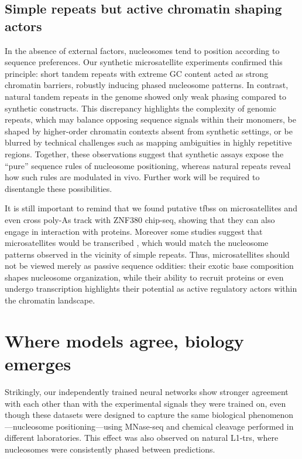 \documentclass[11pt]{book}
\begin{document}
\subsection{Simple repeats but active chromatin shaping actors}
In the absence of external factors, nucleosomes tend to position according to sequence preferences. Our synthetic microsatellite experiments confirmed this principle: short tandem repeats with extreme GC content acted as strong chromatin barriers, robustly inducing phased nucleosome patterns. In contrast, natural tandem repeats in the genome showed only weak phasing compared to synthetic constructs. This discrepancy highlights the complexity of genomic repeats, which may balance opposing sequence signals within their monomers, be shaped by higher-order chromatin contexts absent from synthetic settings, or be blurred by technical challenges such as mapping ambiguities in highly repetitive regions. Together, these observations suggest that synthetic assays expose the “pure” sequence rules of nucleosome positioning, whereas natural repeats reveal how such rules are modulated in vivo. Further work will be required to disentangle these possibilities.

It is still important to remind that we found putative \glspl{tfbs} on microsatellites and even cross poly-As track with ZNF380 chip-seq, showing that they can also engage in interaction with proteins. Moreover some studies suggest that microsatellites would be transcribed \cite{grapotte_discovery_2021}, which would match the nucleosome patterns observed in the vicinity of simple repeats. Thus, microsatellites should not be viewed merely as passive sequence oddities: their exotic base composition shapes nucleosome organization, while their ability to recruit proteins or even undergo transcription highlights their potential as active regulatory actors within the chromatin landscape.

\section{Where models agree, biology emerges}
Strikingly, our independently trained neural networks show stronger agreement with each other than with the experimental signals they were trained on, even though these datasets were designed to capture the same biological phenomenon—nucleosome positioning—using MNase-seq and chemical cleavage performed in different laboratories. This effect was also observed on natural L1-\glspl{tr}, where nucleosomes were consistently phased between predictions.
\end{document}
